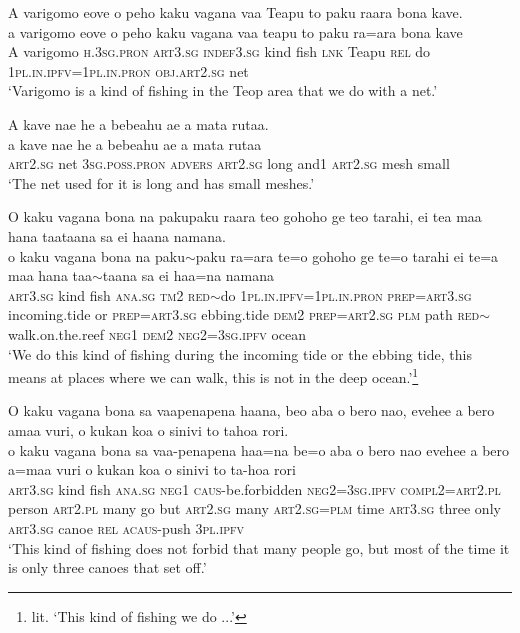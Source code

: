 \ea\label{ex:text23-1}
A varigomo eove o peho kaku vagana vaa Teapu to paku raara bona kave.\\
\gll a	varigomo	eove	o	peho	kaku	vagana	vaa	teapu	to	paku	ra=ara	bona	kave\\
     A	varigomo	\textsc{h}.3\textsc{sg}.\textsc{pron}	\textsc{art}3.\textsc{sg}	\textsc{indef}3.\textsc{sg}	kind	fish	\textsc{lnk}	Teapu	\textsc{rel}	do	1\textsc{pl}.\textsc{in}.\textsc{ipfv}=1\textsc{pl}.\textsc{in}.\textsc{pron}	\textsc{obj}.\textsc{art}2.\textsc{sg}	net\\
\glt `Varigomo is a kind of fishing in the Teop area that we do with a net.'
\z

\ea\label{ex:text23-2}
A kave nae he a bebeahu ae a mata rutaa.\\
\gll a	kave	nae	he	a	bebeahu	ae	a	mata	rutaa\\
     \textsc{art}2.\textsc{sg}	net	3\textsc{sg}.\textsc{poss}.\textsc{pron}	\textsc{advers}	\textsc{art}2.\textsc{sg}	long	and1	\textsc{art}2.\textsc{sg}	mesh	small\\
\glt `The net used for it is long and has small meshes.'
\z

\ea\label{ex:text23-3}
O kaku vagana bona na pakupaku raara teo gohoho ge teo tarahi, ei tea maa hana taataana sa ei haana namana.\\
\gll o	kaku	vagana	bona	na	paku{$\sim$}paku	ra=ara	te=o	gohoho	ge	te=o	tarahi	ei	te=a	maa	hana	taa{$\sim$}taana	sa	ei	haa=na	namana\\
     \textsc{art}3.\textsc{sg}	kind	fish	\textsc{ana}.\textsc{sg}	\textsc{tm}2	\textsc{red}{$\sim$}do	1\textsc{pl}.\textsc{in}.\textsc{ipfv}=1\textsc{pl}.\textsc{in}.\textsc{pron}	\textsc{prep}=\textsc{art}3.\textsc{sg}	incoming.tide	or	\textsc{prep}=\textsc{art}3.\textsc{sg}	ebbing.tide	\textsc{dem}2	\textsc{prep}=\textsc{art}2.\textsc{sg}	\textsc{plm}	path	\textsc{red}{$\sim$}walk.on.the.reef	\textsc{neg}1	\textsc{dem}2	\textsc{neg}2=3\textsc{sg}.\textsc{ipfv}	ocean\\
\glt `We do this kind of fishing during the incoming tide or the ebbing tide, this means at places where we can walk, this is not in the deep ocean.'\footnote{lit. `This kind of fishing we do ...'}
\z

\ea\label{ex:text23-4}
O kaku vagana bona sa vaapenapena haana, beo aba o bero nao, evehee a bero amaa vuri, o kukan koa o sinivi to tahoa rori.\\
\gll o	kaku	vagana	bona	sa	vaa-penapena	haa=na	be=o	aba	o	bero	nao	evehee	a	bero	a=maa	vuri	o	kukan	koa	o	sinivi	to	ta-hoa	rori\\
     \textsc{art}3.\textsc{sg}	kind	fish	\textsc{ana}.\textsc{sg}	\textsc{neg}1	\textsc{caus}-be.forbidden	\textsc{neg}2=3\textsc{sg}.\textsc{ipfv}	\textsc{compl}2=\textsc{art}2.\textsc{pl}	person	\textsc{art}2.\textsc{pl}	many	go	but	\textsc{art}2.\textsc{sg}	many	\textsc{art}2.\textsc{sg}=\textsc{plm}	time	\textsc{art}3.\textsc{sg}	three	only	\textsc{art}3.\textsc{sg}	canoe	\textsc{rel}	\textsc{acaus}-push	3\textsc{pl}.\textsc{ipfv}\\
\glt `This kind of fishing does not forbid that many people go, but most of the time it is only three canoes that set off.'
\z


